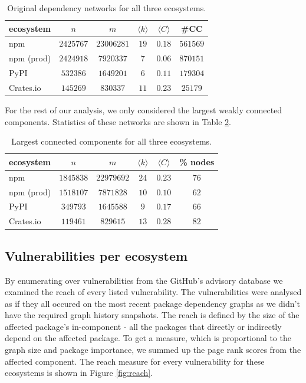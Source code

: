 \documentclass[9pt,twocolumn,twoside]{pnas-report}
\begin{document}
\begin{table}[h]\centering%
	\caption{Original dependency networks for all three ecosystems.}
	\begin{tabular}{l|ccccc}
		ecosystem  & $n$       & $m$        & $\langle k\rangle$ & $\langle C\rangle$ & \#CC     \\\hline
		npm        & $2425767$ & $23006281$ & $19$               & $0.18$             & $561569$ \\
		npm (prod) & $2424918$ & $7920337$  & $7$                & $0.06$             & $870151$ \\
		PyPI       & $532386$  & $1649201$  & $6$                & $0.11$             & $179304$ \\
		Crates.io  & $145269$  & $830337$   & $11$               & $0.23$             & $25179$  \\
	\end{tabular}
	\label{tab:basic_stats}
\end{table}

For the rest of our analysis, we only considered the largest weakly connected components.
Statistics of these networks are shown in Table \ref{tab:lcc_stats}.

\begin{table}[h]\centering%
	\caption{Largest connected components for all three ecosystems.}
	\begin{tabular}{l|ccccc}
		ecosystem  & $n$       & $m$        & $\langle k\rangle$ & $\langle C\rangle$ & \% nodes \\\hline
		npm        & $1845838$ & $22979692$ & $24$               & $0.23$             & $76$     \\
		npm (prod) & $1518107$ & $7871828$  & $10$               & $0.10$             & $62$     \\
		PyPI       & $349793$  & $1645588$  & $9$                & $0.17$             & $66$     \\
		Crates.io  & $119461$  & $829615$   & $13$               & $0.28$             & $82$     \\
	\end{tabular}
	\label{tab:lcc_stats}
\end{table}

\subsection*{Vulnerabilities per ecosystem}

By enumerating over vulnerabilities from the GitHub's advisory database we examined the reach of every listed vulnerability.
The vulnerabilities were analysed as if they all occured on the most recent package dependency graphs as we didn't have the required graph history snapshots.
The reach is defined by the size of the affected package's in-component - all the packages that directly or indirectly depend on the affected package.
To get a measure, which is proportional to the graph size and package importance, we summed up the page rank scores from the affected component.
The reach measure for every vulnerability for these ecosystems is shown in Figure \ref{fig:reach}.
\end{document}
